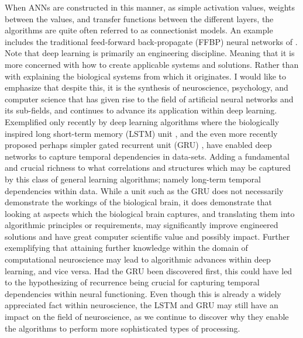 When ANNs are constructed in this manner, as simple activation values, weights between the values, and transfer functions between the different layers, the algorithms are quite often referred to as connectionist models. An example includes the traditional feed-forward back-propagate (FFBP) neural networks of \citep{Rumelhart1986}.
Note that deep learning is primarily an engineering discipline. Meaning that it is more concerned with how to create applicable systems and solutions. Rather than with explaining the biological systems from which it originates. I would like to emphasize that despite this, it is the synthesis of neuroscience, psychology, and computer science that has given rise to the field of artificial neural networks and its sub-fields, and continues to advance its application within deep learning. Exemplified only recently by deep learning algorithms where the biologically inspired long short-term memory (LSTM) unit \citep{Hochreiter1997}, and the even more recently proposed perhaps simpler gated recurrent unit (GRU) \citep{Mnih2015}, have enabled deep networks to capture temporal dependencies in data-sets. Adding a fundamental and crucial richness to what correlations and structures which may be captured by this class of general learning algorithms; namely long-term temporal dependencies within data. While a unit such as the GRU does not necessarily demonstrate the workings of the biological brain, it does demonstrate that looking at aspects which the biological brain captures, and translating them into algorithmic principles or requirements, may significantly improve engineered solutions and have great computer scientific value and possibly impact. Further exemplifying that attaining further knowledge within the domain of computational neuroscience may lead to algorithmic advances within deep learning, and vice versa. Had the GRU been discovered first, this could have led to the hypothesizing of recurrence being crucial for capturing temporal dependencies within neural functioning. Even though this is already a widely appreciated fact within neuroscience, the LSTM and GRU may still have an impact on the field of neuroscience, as we continue to discover why they enable the algorithms to perform more sophisticated types of processing.

